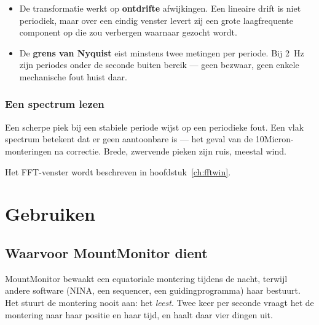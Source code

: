 \begin{itemize}
  \item De transformatie werkt op \textbf{ontdrifte} afwijkingen. Een lineaire
  drift is niet periodiek, maar over een eindig venster levert zij een grote
  laagfrequente component op die zou verbergen waarnaar gezocht wordt.
  \item De \textbf{grens van Nyquist} eist minstens twee metingen per periode.
  Bij 2~Hz zijn periodes onder de seconde buiten bereik --- geen bezwaar, geen
  enkele mechanische fout huist daar.
\end{itemize}

\section{Een spectrum lezen}

Een scherpe piek bij een stabiele periode wijst op een periodieke fout. Een vlak
spectrum betekent dat er geen aantoonbare is --- het geval van de
10Micron-monteringen na correctie. Brede, zwervende pieken zijn ruis, meestal
wind.

Het FFT-venster wordt beschreven in hoofdstuk~\ref{ch:fftwin}.

\part{Gebruiken}

\chapter{Waarvoor MountMonitor dient}
\label{ch:purpose}

MountMonitor bewaakt een equatoriale montering tijdens de nacht, terwijl andere
software (NINA, een sequencer, een guidingprogramma) haar bestuurt. Het stuurt
de montering nooit aan: het \emph{leest}. Twee keer per seconde vraagt het de
montering naar haar positie en haar tijd, en haalt daar vier dingen uit.

